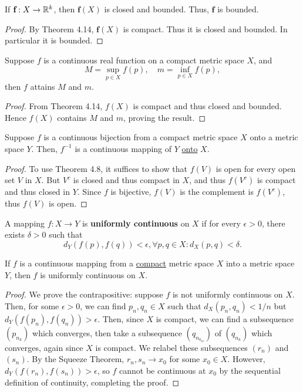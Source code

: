 \begin{theorem} %
    If $\textbf{f} : X \rightarrow \mathbb{R}^k$, then $\textbf{f}(X)$ is closed and bounded. Thus, $\textbf{f}$ is bounded.
\begin{proof}
    By Theorem 4.14, $\textbf{f}(X)$ is compact. Thus it is closed and bounded. In particular it is bounded.
\end{proof}
\end{theorem}

\begin{theorem} %
    Suppose $f$ is a continuous real function on a compact metric space $X$, and
    \[
        M = \sup_{p \in X} f(p),\quad m = \inf_{p \in X} f(p),
    \]
    then $f$ attains $M$ and $m$.

\begin{proof}
    From Theorem 4.14, $f(X)$ is compact and thus closed and bounded. Hence $f(X)$ contains $M$ and $m$, proving the result.
\end{proof}
\end{theorem}

\begin{theorem} %
    Suppose $f$ is a continuous bijection from a compact metric space $X$ onto a metric space $Y$. Then, $f^{-1}$ is a continuous mapping of $Y$ \underline{onto} $X$.
\begin{proof}
    To use Theorem 4.8, it suffices to show that $f(V)$ is open for every open set $V$ in $X$. But $V^c$ is closed and thus compact in $X$, and thus $f(V^c)$ is compact and thus closed in $Y$. Since $f$ is bijective, $f(V)$ is the complement is $f(V^c)$, thus $f(V)$ is open.
\end{proof}
\end{theorem}

\begin{definition} %
    A mapping $f: X \to Y$ is \textbf{uniformly continuous} on $X$ if for every $\epsilon > 0$, there exists $\delta > 0$ such that
    \[
        d_Y(f(p), f(q)) < \epsilon, \forall p, q \in X : d_X(p, q) < \delta.
    \]
\end{definition}

\begin{theorem} %
    If $f$ is a continuous mapping from a \underline{compact} metric space $X$ into a metric space $Y$, then $f$ is uniformly continuous on $X$.
\begin{proof} 
    We prove the contrapositive: suppose $f$ is not uniformly continuous on $X$. Then, for some $\epsilon > 0$, we can find $p_n, q_n \in X$ such that $d_X(p_n, q_n) < 1/n$ but $d_Y(f(p_n), f(q_n)) > \epsilon$. Then, since $X$ is compact, we can find a subsequence $(p_{n_k})$ which converges, then take a subsequence $(q_{n_{k_m}})$ of $(q_{n_k})$ which converges, again since $X$ is compact. We relabel these subsequences $(r_n)$ and $(s_n)$. By the Squeeze Theorem, $r_n, s_n \to x_0$ for some $x_0 \in X$. However, $d_Y(f(r_n), f(s_n)) > \epsilon$, so $f$ cannot be continuous at $x_0$ by the sequential definition of continuity, completing the proof.
\end{proof}
\end{theorem}

\begin{theorem} %

\end{theorem}
